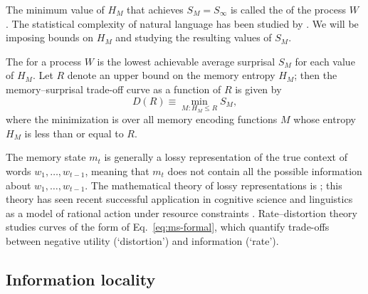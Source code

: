 The minimum value of $H_M$ that achieves $S_M = S_\infty$ is called the  of the process $W$ \citep{shalizi2001computational}.
The statistical complexity of natural language has been studied by \citet{hahn2019estimating}.
We will be imposing bounds on $H_M$ and studying the resulting values of $S_M$. 

\begin{definition}
The  for a process $W$ is the lowest achievable average surprisal $S_M$ for each value of $H_M$. Let $R$ denote an upper bound on the memory entropy $H_M$; then the memory--surprisal trade-off curve as a function of $R$ is given by
\begin{equation}
    \label{eq:ms-formal}
    D(R) \equiv \min_{M : H_M \le R} S_M,
\end{equation}
where the minimization is over all memory encoding functions $M$ whose entropy $H_M$ is less than or equal to $R$.
\end{definition}

The memory state $m_t$ is generally a lossy representation of the true context of words $w_1, \dots, w_{t-1}$, meaning that $m_t$ does not contain all the possible information about $w_1, \dots, w_{t-1}$. The mathematical theory of lossy representations is  \citep[for an overview and key results, see][pp. 301--347]{cover2006elements}; this theory has seen recent successful application in cognitive science and linguistics as a model of rational action under resource constraints \citep{sims2018efficient,zaslavsky2018efficient}. %
Rate--distortion theory studies curves of the form of Eq.~\ref{eq:ms-formal}, which quantify trade-offs between negative utility (`distortion') and information (`rate'). %


\subsection{Information locality}
\label{sec:infoloc}\label{sec:tradeoff}

